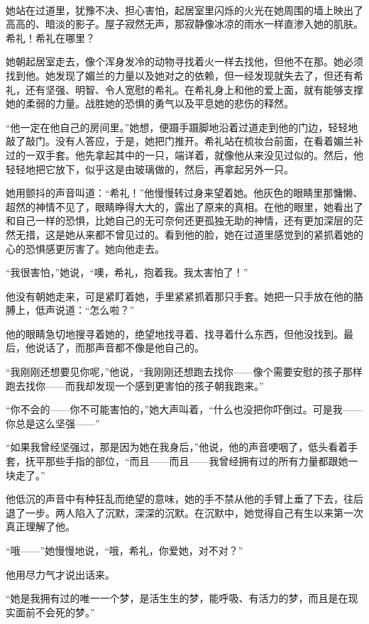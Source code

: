 \par  
\par 她站在过道里，犹豫不决、担心害怕，起居室里闪烁的火光在她周围的墙上映出了高高的、暗淡的影子。屋子寂然无声，那寂静像冰凉的雨水一样直渗入她的肌肤。希礼！希礼在哪里？
\par 她朝起居室走去，像个浑身发冷的动物寻找着火一样去找他，但他不在那。她必须找到他。她发现了媚兰的力量以及她对之的依赖，但一经发现就失去了，但还有希礼，还有坚强、明智、令人宽慰的希礼。在希礼身上和他的爱上面，就有能够支撑她的柔弱的力量。战胜她的恐惧的勇气以及平息她的悲伤的释然。
\par “他一定在他自己的房间里。”她想，便蹑手蹑脚地沿着过道走到他的门边，轻轻地敲了敲门。没有人答应，于是，她把门推开。希礼站在梳妆台前面，在看着媚兰补过的一双手套。他先拿起其中的一只，端详着，就像他从来没见过似的。然后，他轻轻地把它放下，似乎这是由玻璃做的，然后，再拿起另外一只。
\par 她用颤抖的声音叫道：“希礼！”他慢慢转过身来望着她。他灰色的眼睛里那慵懒、超然的神情不见了，眼睛睁得大大的，露出了原来的真相。在他的眼里，她看出了和自己一样的恐惧，比她自己的无可奈何还更孤独无助的神情，还有更加深层的茫然无措，这是她从来都不曾见过的。看到他的脸，她在过道里感觉到的紧抓着她的心的恐惧感更厉害了。她向他走去。
\par “我很害怕，”她说，“噢，希礼，抱着我。我太害怕了！”
\par 他没有朝她走来，可是紧盯着她，手里紧紧抓着那只手套。她把一只手放在他的胳膊上，低声说道：“怎么啦？”
\par 他的眼睛急切地搜寻着她的，绝望地找寻着、找寻着什么东西，但他没找到。最后，他说话了，而那声音都不像是他自己的。
\par “我刚刚还想要见你呢，”他说，“我刚刚还想跑去找你——像个需要安慰的孩子那样跑去找你——而我却发现一个感到更害怕的孩子朝我跑来。”
\par “你不会的——你不可能害怕的，”她大声叫着，“什么也没把你吓倒过。可是我——你总是这么坚强——”
\par “如果我曾经坚强过，那是因为她在我身后，”他说，他的声音哽咽了，低头看着手套，抚平那些手指的部位，“而且——而且——我曾经拥有过的所有力量都跟她一块走了。”
\par 他低沉的声音中有种狂乱而绝望的意味，她的手不禁从他的手臂上垂了下去，往后退了一步。两人陷入了沉默，深深的沉默。在沉默中，她觉得自己有生以来第一次真正理解了他。
\par “哦——”她慢慢地说，“哦，希礼，你爱她，对不对？”
\par 他用尽力气才说出话来。
\par “她是我拥有过的唯一一个梦，是活生生的梦，能呼吸、有活力的梦，而且是在现实面前不会死的梦。”

